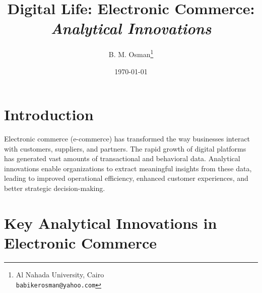 \documentclass[12pt]{article}
\title{\textcolor{titleColor}{\textbf{\Huge Digital Life: \color{blue} Electronic Commerce:\\ \textit {\large  \color{red} Analytical Innovations }}}}
\author{B. M. Osman\thanks{Al Nahada University, Cairo \\ \texttt{babikerosman@yahoo.com}}}
\date{\today}
\begin{document}
\maketitle

\section{Introduction}

Electronic commerce (e-commerce) has transformed the way businesses interact with customers, suppliers, and partners. The rapid growth of digital platforms has generated vast amounts of transactional and behavioral data. Analytical innovations enable organizations to extract meaningful insights from these data, leading to improved operational efficiency, enhanced customer experiences, and better strategic decision-making.

\section{Key Analytical Innovations in Electronic Commerce}
\end{document}
